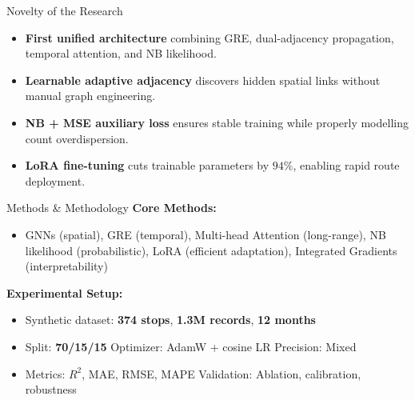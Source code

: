 \documentclass[aspectratio=169, 11pt]{beamer}
\begin{document}
\begin{frame}{Novelty of the Research}
  \begin{itemize}
    \item \textbf{First unified architecture} combining GRE, dual-adjacency propagation, temporal attention, and NB likelihood.
    \item \textbf{Learnable adaptive adjacency} discovers hidden spatial links without manual graph engineering.
    \item \textbf{NB + MSE auxiliary loss} ensures stable training while properly modelling count overdispersion.
    \item \textbf{LoRA fine-tuning} cuts trainable parameters by \textcolor{accent}{$94\%$}, enabling rapid route deployment.
  \end{itemize}
\end{frame}

\begin{frame}{Methods \& Methodology}
  \textbf{Core Methods:}
  \begin{itemize}
    \item GNNs (spatial), GRE (temporal), Multi-head Attention (long-range), NB likelihood (probabilistic), LoRA (efficient adaptation), Integrated Gradients (interpretability)
  \end{itemize}

  \vspace{0.3em}
  \textbf{Experimental Setup:}
  \begin{itemize}
    \item Synthetic dataset: \textbf{374 stops}, \textbf{1.3M records}, \textbf{12 months}
    \item Split: \textbf{70/15/15} \quad Optimizer: AdamW + cosine LR \quad Precision: Mixed
    \item Metrics: $R^{2}$, MAE, RMSE, MAPE \quad Validation: Ablation, calibration, robustness
  \end{itemize}
\end{frame}
\end{document}

